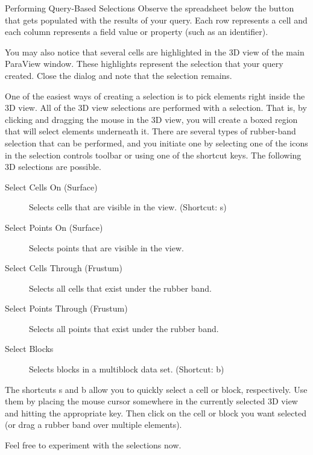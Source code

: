 \begin{exercise}{Performing Query-Based Selections}
  Observe the spreadsheet below the  button that
  gets populated with the results of your query.  Each row represents a
  cell and each column represents a field value or property (such as an
  identifier).

  You may also notice that several cells are highlighted in the 3D view of
  the main ParaView window.  These highlights represent the selection that
  your query created.  Close the  dialog and note that the
  selection remains.
\end{exercise}

One of the easiest ways of creating a selection is to pick elements right
inside the 3D view.  All of the 3D view selections are performed with a
 selection.  That is, by clicking and dragging the
mouse in the 3D view, you will create a boxed region that will select
elements underneath it.  There are several types of rubber-band selection
that can be performed, and you initiate one by selecting one of the icons
in the selection controls toolbar or using one of the shortcut keys.  The
following 3D selections are possible.

\begin{description}
\item[\selectCellsOn Select Cells On (Surface)] Selects cells that are
  visible in the view.  (Shortcut: s)
\item[\selectPointsOn Select Points On (Surface)] Selects points that are
  visible in the view.
\item[\selectCellsThrough Select Cells Through (Frustum)] Selects all cells
  that exist under the rubber band.
\item[\selectPointsThrough Select Points Through (Frustum)] Selects all
  points that exist under the rubber band.
\item[\selectBlocks Select Blocks] Selects blocks in a
  multiblock data set.  (Shortcut: b)
\end{description}

The shortcuts s and b allow you to quickly select a cell or block,
respectively.  Use them by placing the mouse cursor somewhere in the
currently selected 3D view and hitting the appropriate key.  Then click on
the cell or block you want selected (or drag a rubber band over multiple
elements).

Feel free to experiment with the selections now.

